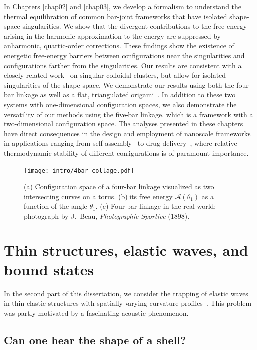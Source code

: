 In Chapters \ref{chap02} and \ref{chap03}, we develop a formalism to understand the thermal equilibration of common bar-joint frameworks that have isolated shape-space singularities.
We show that the divergent contributions to the free energy arising in the harmonic approximation to the energy are suppressed by anharmonic, quartic-order corrections.
These findings show the existence of energetic free-energy barriers between configurations near the singularities and configurations farther from the singularities.
Our results are consistent with a closely-related work~\cite{kallus2017,holmes-cerfon2017} on singular colloidal clusters, but allow for isolated singularities of the shape space.
We demonstrate our results using both the four-bar linkage as well as a flat, triangulated origami~\cite{chen2018}.
In addition to these two systems with one-dimensional configuration spaces, we also demonstrate the versatility of our methods using the five-bar linkage, which is a framework with a two-dimensional configuration space.
The analyses presented in these chapters have direct consequences in the design and employment of nanoscale frameworks in applications ranging from self-assembly~\cite{liedl2010} to drug delivery~\cite{zhao2019}, where relative thermodynamic stability of different configurations is of paramount importance.
%
\begin{figure}
  \begin{center}
    \texttt{[image: intro/4bar\_collage.pdf]}
  \end{center}
\caption{(a) Configuration space of a four-bar linkage visualized as two intersecting curves on a torus. (b) its free energy $\mathscr{A}(\theta_{1})$ as a function of the angle $\theta_{1}$. (c) Four-bar linkage in the real world; photograph by J.~Beau, \emph{Photographie Sportive} (1898).}
  \label{fig:4bar_collage}
\end{figure}

\section{Thin structures, elastic waves, and bound states}

In the second part of this dissertation, we consider the trapping of elastic waves in thin elastic structures with spatially varying curvature profiles~\cite{mannattil2023}.
This problem was partly motivated by a fascinating acoustic phenomenon.

\subsection{Can one hear the shape of a shell?}

